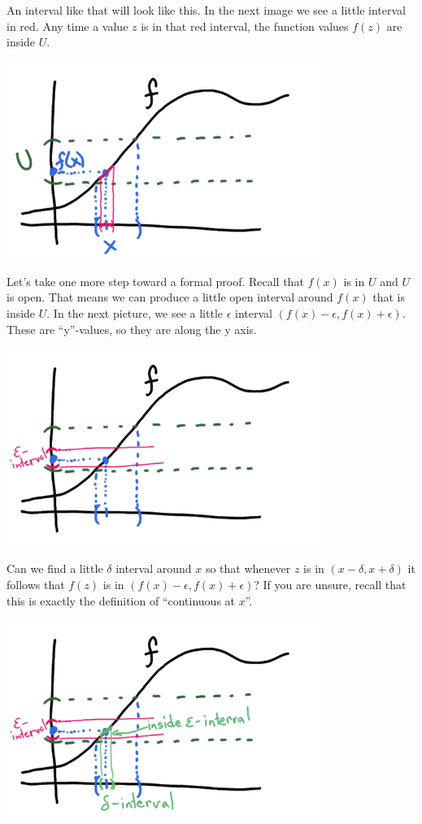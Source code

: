 \documentclass[11pt]{book}
\numberwithin{example}{chapter}
\begin{document}
An interval like that will look like this.  In the next image we see a little interval in red.  Any time a value $z$ is in that red interval, the function values $f(z)$ are inside $U$.  

\begin{center}
\includegraphics[width=4in]{toplec1_6.png}
\end{center}

Let's take one more step toward a formal proof.  Recall that $f(x)$ is in $U$ and $U$ is open.  That means we can produce a little open interval around $f(x)$ that is inside $U$.  In the next picture, we see a little $\epsilon$ interval $(f(x)-\epsilon, f(x)+\epsilon)$.  These are ``y''-values, so they are along the y axis.  

\begin{center}
\includegraphics[width=4in]{toplec1_7.png}
\end{center}


Can we find a little $\delta$ interval around $x$ so that whenever $z$ is in  $(x-\delta,x+\delta)$ it follows that  $f(z)$ is in $(f(x)-\epsilon, f(x)+\epsilon)$?  If you are unsure, recall that this is exactly the definition of ``continuous at $x$''. 


\begin{center}
\includegraphics[width=4in]{toplec1_8.png}
\end{center}
\end{document}
